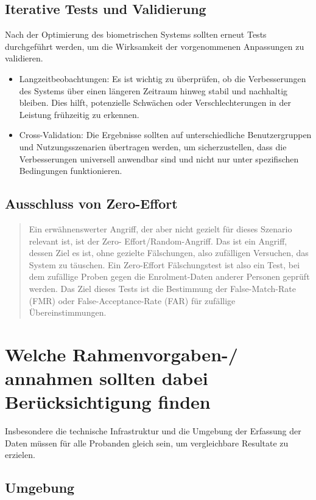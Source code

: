 \documentclass{article}
\begin{document}
\subsection{Iterative Tests und Validierung}

Nach der Optimierung des biometrischen Systems sollten erneut Tests durchgeführt werden, um die Wirksamkeit der vorgenommenen Anpassungen zu validieren.

\begin{itemize}
	\item Langzeitbeobachtungen: Es ist wichtig zu überprüfen, ob die Verbesserungen des Systems über einen längeren Zeitraum hinweg stabil und nachhaltig bleiben. Dies hilft, potenzielle Schwächen oder Verschlechterungen in der Leistung frühzeitig zu erkennen.
	\item Cross-Validation: Die Ergebnisse sollten auf unterschiedliche Benutzergruppen und Nutzungsszenarien übertragen werden, um sicherzustellen, dass die Verbesserungen universell anwendbar sind und nicht nur unter spezifischen Bedingungen funktionieren.
\end{itemize}

\subsection*{Ausschluss von Zero-Effort}

\begin{quote}
	Ein erwähnenswerter Angriff, der aber nicht gezielt für dieses Szenario relevant ist, ist der Zero-
	Effort/Random-Angriff. Das ist ein Angriff, dessen Ziel es ist, ohne gezielte Fälschungen, also 
	zufälligen Versuchen, das System zu täuschen. Ein Zero-Effort Fälschungstest ist also ein Test, bei 
	dem zufällige Proben gegen die Enrolment-Daten anderer Personen geprüft werden. Das Ziel dieses Tests 
	ist die Bestimmung der False-Match-Rate (FMR) oder False-Acceptance-Rate (FAR) für zufällige 
	Übereinstimmungen.	
\end{quote}

\section{Welche Rahmenvorgaben-/ annahmen sollten dabei Berücksichtigung finden}

Insbesondere die technische Infrastruktur und die Umgebung der Erfassung der Daten müssen für alle Probanden gleich sein, um vergleichbare Resultate zu erzielen.

\subsection{Umgebung}
\end{document}
